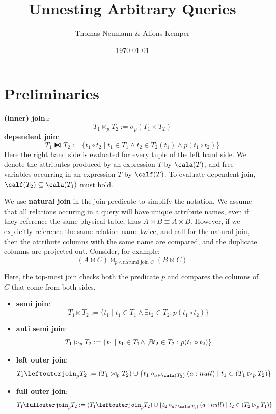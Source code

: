 \documentclass[11pt]{article}
\author{Thomas Neumann \& Alfons Kemper}
\date{\today}
\title{Unnesting Arbitrary Queries}
\begin{document}
\maketitle
\section{Preliminaries}
\label{sec:orgd6e31b4}
\textbf{(inner) join}:r
\begin{equation*}
T_1\bowtie_p T_2:=\sigma_p(T_1\times T_2)
\end{equation*}
\textbf{dependent join}:
\begin{equation*}
T_1\lfbowtie T_2:=\{t_1\circ t_2\mid t_1\in T_1\wedge t_2\in T_2(t_1)\wedge p(t_1\circ t_2)\}
\end{equation*}
Here the right hand side is evaluated for every tuple of the left hand side. We denote the attributes
produced by an expression \(T\) by \(\cala(T)\), and free variables occurring in an expression \(T\)
by \(\calf(T)\). To evaluate dependent join, \(\calf(T_2)\subseteq \cala(T_1)\) must hold.

We use \textbf{natural join} in the join predicate to simplify the notation. We assume that all relations
occuring in a query will have unique attribute names, even if they reference the same physical table,
thus \(A\bowtie B\equiv A\times B\). However, if we explicitly reference the same relation name twice,
and call for the natural join, then the attribute columns with the same name are compared, and the
duplicate columns are projected out. Consider, for example:
\begin{equation*}
(A\bowtie C)\bowtie_{p\wedge\text{natural join }C}(B\bowtie C)
\end{equation*}

Here, the top-most join checks both the predicate \(p\) and compares the columns of \(C\) that come
from both sides.

\begin{itemize}
\item \textbf{semi join}:
\begin{equation*}
T_1\ltimes T_2:=\{t_1\mid t_1\in T_1\wedge \exists t_2\in T_2:p(t_1\circ t_2)\}
\end{equation*}
\item \textbf{anti semi join}:
\begin{equation*}
T_1\rhd_pT_2:=\{t_1\mid t_1\in T_1\wedge\not\exists t_2\in T_2:p(t_1\circ t_2)\}
\end{equation*}
\item \textbf{left outer join}:
\begin{equation*}
T_1\leftouterjoin_pT_2:=(T_1\bowtie_pT_2)\cup\{t_1\circ_{a\in\cala(T_2)}(a:null)\mid
t_1\in(T_1\rhd_pT_2)\}
\end{equation*}
\item \textbf{full outer join}:
\begin{equation*}
T_1\fullouterjoin_p T_2:=(T_1\leftouterjoin_p T_2)\cup\{t_2\circ_{a\in\cala(T_1)}(a:null)\mid t_2\in(T_2\rhd_pT_1)\}
\end{equation*}
\end{itemize}
\end{document}
